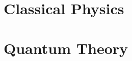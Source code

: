 \documentclass[12pt, a4paper]{report}
\begin{document}
% 
% 
% 
% 
% 
% 
% 

% 
% 
% 
% 
% 
% 
% 
% 
% 
% 
% 
% 
% 
% 
% 



% 
% 
% 
% 
% 

\part{Classical Physics}

% 
% 
% 

\part{Quantum Theory}\label{part:qm}


% 
% 
% 
% 
\end{document}
